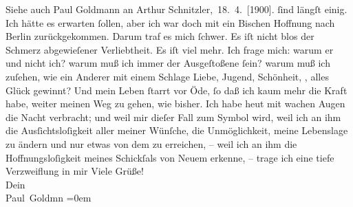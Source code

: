 \begin{ledgroupsized}[t]{13cm}
{{{                  Siehe auch Paul Goldmann an Arthur Schnitzler, 18. 4. [1900].}}}\label{K_L02932-1h} ſind längſt
               einig. Ich hätte es erwarten ſollen, aber ich war doch mit ein Bischen Hoffnung nach
                  Berlin zurückgekommen. Darum traf es mich
               ſchwer. Es iſt nicht blos der Schmerz abgewieſener Verliebtheit. Es iſt viel mehr.
               Ich frage mich: warum er und nicht ich? warum muß ich immer der Ausgeſtoßene ſein?
               warum muß ich {\pb}zuſehen, wie ein Anderer mit einem Schlage Liebe, Jugend,
               Schönheit, \label{K_L02932-22v}\label{K_L02932-22h}, alles Glück gewinnt? Und mein Leben ſtarrt vor Öde,
               ſo daß ich kaum mehr die Kraft habe, weiter meinen Weg zu gehen, wie bisher. Ich habe
                  heut mit wachen Augen die Nacht verbracht; und weil
               mir dieſer Fall zum Symbol wird, weil ich an ihm die Ausſichtsloſigkeit aller meiner
               Wünſche, die Unmöglichkeit, meine Lebenslage zu ändern und nur etwas von dem \label{K_L02932-2v}\label{K_L02932-2h} zu erreichen, – weil ich an ihm die
               Hoffnungsloſigkeit meines Schickſals von Neuem erkenne, – trage ich eine tiefe
               Verzweiflung in mir{\dotsfive}\pend
           \pstart
           Viele Grüße! {\\[\baselineskip]}Dein {\\[\baselineskip]}\spacefill\mbox{Paul Goldmn}\pend
           \leftskip=0em{}
         
         \endnumbering{}\end{ledgroupsized}  \newcommand{\dateiname}{L02932}\newcommand{\titel}{Paul Goldmann an Arthur Schnitzler, 20. 9. [1900]}\newcommand{\editorInnen}{Martin Anton Müller und Laura Untner}
      